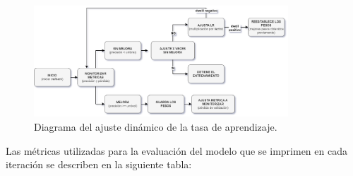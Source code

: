 \begin{figure}[H]
   \begin{center}
   \includegraphics[width=0.85\textwidth]{./Graphics/diagrama_lra.drawio.png}
   \caption{Diagrama del ajuste dinámico de la tasa de aprendizaje.}
   \label{fig:lra_permormance}
   \end{center}
   \end{figure}

Las métricas utilizadas para la evaluación del modelo que se imprimen en cada iteración se describen en la siguiente tabla:

